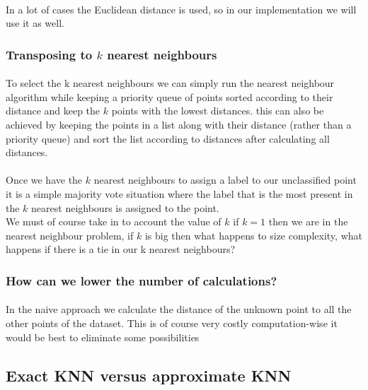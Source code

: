 \documentclass[11 pt]{article}
\begin{document}
\paragraph{}In a lot of cases the Euclidean distance is used, so in our implementation we will use it as well.
\subsubsection{Transposing to $k$ nearest neighbours}
\paragraph{}To select the k nearest neighbours we can simply run the nearest neighbour algorithm while keeping a priority queue of points sorted according to their distance and keep the $k$ points with the lowest distances. this can also be achieved by keeping the points in a list along with their distance (rather than a priority queue) and sort the list according to distances after calculating all distances.
\paragraph{}Once we have the $k$ nearest neighbours to assign a label to our unclassified point it is a simple majority vote situation where the label that is the most present in the $k$ nearest neighbours is assigned to the point.\\
We must of course take in to account the value of $k$ if $k=1$ then we are in the nearest neighbour problem, if $k$ is big then what happens to size complexity, what happens if there is a tie in our k nearest neighbours?

\subsubsection{How can we lower the number of calculations?}
\paragraph{}In the naive approach we calculate the distance of the unknown point to all the other points of the dataset. This is of course very costly computation-wise it would be best to eliminate some possibilities


\subsection{Exact KNN versus approximate KNN}
\end{document}
